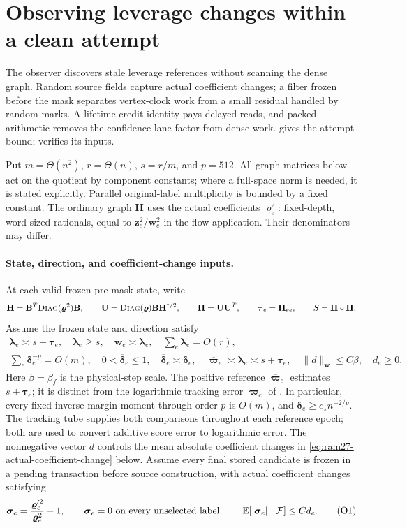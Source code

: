 \documentclass[11pt]{article}
\theoremstyle{remark}
\newcommand{\BB}{\mathbf B}
\newcommand{\HH}{\mathbf H}
\newcommand{\PPi}{\boldsymbol{\Pi}}
\newcommand{\UU}{\mathbf U}
\newcommand{\llambda}{\boldsymbol{\lambda}}
\newcommand{\ttau}{\boldsymbol{\tau}}
\newcommand{\ww}{\mathbf w}
\newcommand{\zz}{\mathbf z}
\newcommand{\vvr}{\boldsymbol{\varrho}}
\newcommand{\vvp}{\boldsymbol{\varpi}}
\newcommand{\vvpbar}{\overline{\boldsymbol{\varpi}}}
\newcommand{\ssigma}{\boldsymbol{\sigma}}
\newcommand{\ddelta}{\boldsymbol{\delta}}
\newcommand{\ddeltabar}{\overline{\boldsymbol{\delta}}}
\newcommand{\diag}{\textsc{Diag}}
\newcommand{\Ex}{\mathbb E}
\newcommand{\norm}[1]{\lVert#1\rVert}
\begin{document}
\section{Observing leverage changes within a clean attempt}
\label{sec:ram27-observer}

The observer discovers stale leverage references without scanning the dense
graph.
Random source fields capture actual coefficient changes; a filter frozen before
the mask separates vertex-clock work from a small residual handled by random
marks.
A lifetime credit identity pays delayed reads, and packed arithmetic removes the
confidence-lane factor from dense work.
 gives the attempt bound;
 verifies its inputs.

Put $m=\Theta(n^2)$,
$r=\Theta(n)$, $s=r/m$, and $p=512$.
All graph matrices below act on the quotient by component constants; where a
full-space norm is needed, it is stated explicitly.
Parallel original-label multiplicity is bounded by a fixed constant.
The ordinary graph $\HH$ uses the actual coefficients $\vvr_e^2$: fixed-depth,
word-sized rationals, equal to $\zz_e^2/\ww_e^2$ in the flow application.
Their denominators may differ.

\paragraph{State, direction, and coefficient-change inputs.}
At each valid frozen pre-mask state, write
\[
 \HH=\BB^T\diag(\vvr^2)\BB,\qquad
 \UU=\diag(\vvr)\BB\HH^{\dagger/2},\qquad
 \PPi=\UU\UU^T,\qquad \ttau_e=\PPi_{ee},\qquad S=\PPi\circ\PPi.
\]
Assume the frozen state and direction satisfy
\begin{equation}\label{eq:ram27-state}
\begin{gathered}
 \llambda_e\asymp s+\ttau_e,\quad \llambda_e\ge s,\quad
 \ww_e\asymp\llambda_e,\quad \sum_e\llambda_e=O(r),\\
 \sum_e\ddelta_e^{-p}=O(m),\quad
 0<\ddeltabar_e\le1,\quad \ddeltabar_e\asymp\ddelta_e,\quad
 \vvpbar_e\asymp\llambda_e\asymp s+\ttau_e,\quad
 \norm{d}_{\ww}\le C\beta,\quad d_e\ge0 .
\end{gathered}
\end{equation}
Here $\beta=\beta_f$ is the physical-step scale.
The positive reference $\vvpbar_e$ estimates $s+\ttau_e$; it is distinct from the
logarithmic tracking error $\vvp_e$ of .
In particular, every fixed inverse-margin moment through order $p$ is $O(m)$,
and $\ddelta_e\ge c_\star n^{-2/p}$.
The tracking tube supplies both comparisons throughout each reference epoch;
both are used to convert additive score error to logarithmic error.
The nonnegative vector $d$ controls the mean absolute coefficient changes in
\eqref{eq:ram27-actual-coefficient-change} below.
Assume every final stored candidate is frozen in a pending transaction before
source construction, with actual coefficient changes satisfying
\[
 \ssigma_e=\frac{\vvr_e'^2}{\vvr_e^2}-1,\qquad
 \ssigma_e=0\ \hbox{on every unselected label},\qquad
 \Ex[|\ssigma_e|\mid\mathcal F]\le C d_e.                 \tag{O1}\label{eq:ram27-actual-coefficient-change}
\]
\end{document}
